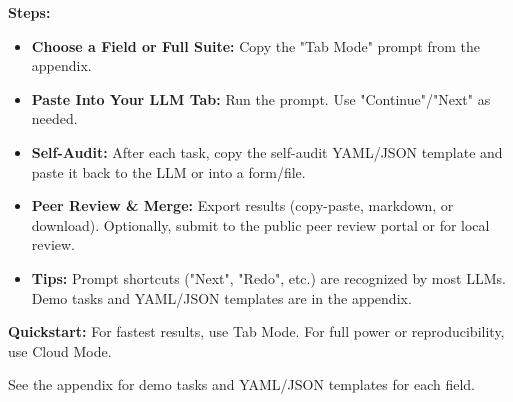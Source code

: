 \textbf{Steps:}
\begin{itemize}
  \item \textbf{Choose a Field or Full Suite:} Copy the "Tab Mode" prompt from the appendix.
  \item \textbf{Paste Into Your LLM Tab:} Run the prompt. Use "Continue"/"Next" as needed.
  \item \textbf{Self-Audit:} After each task, copy the self-audit YAML/JSON template and paste it back to the LLM or into a form/file.
  \item \textbf{Peer Review \& Merge:} Export results (copy-paste, markdown, or download). Optionally, submit to the public peer review portal or for local review.
  \item \textbf{Tips:} Prompt shortcuts ("Next", "Redo", etc.) are recognized by most LLMs. Demo tasks and YAML/JSON templates are in the appendix.
\end{itemize}

\noindent\textbf{Quickstart:} For fastest results, use Tab Mode. For full power or reproducibility, use Cloud Mode.

See the appendix for demo tasks and YAML/JSON templates for each field.